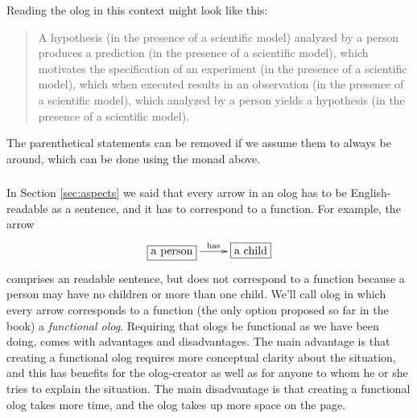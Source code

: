 \documentclass[CT4S-EN-RU]{subfiles}
\begin{document}
\begin{exampleENG}
Reading the olog in this context might look like this:

\begin{quote}
A hypothesis (in the presence of a scientific model) analyzed by a person produces a prediction (in the presence of a scientific model), which motivates the specification of an experiment (in the presence of a scientific model), which when executed results in an observation (in the presence of a scientific model), which analyzed by a person yields a hypothesis (in the presence of a scientific model).
\end{quote}

The parenthetical statements can be removed if we assume them to always be around, which can be done using the monad above.
\end{exampleENG}

\begin{exampleRUS}\label{ex:scientific method}
\end{exampleRUS}


\subsubsection{}\label{sec:relaxing ologs}

\begin{blockENG}
In Section \ref{sec:aspects} we said that every arrow in an olog has to be English-readable as a sentence, and it has to correspond to a function. For example, the arrow 
\begin{align}\label{dia:non-functional but english}
\xymatrix{\fbox{a person}\LA{r}{has}&\fbox{a child}}
\end{align}
comprises an readable sentence, but does not correspond to a function because a person may have no children or more than one child. 
We'll call olog in which every arrow corresponds to a function (the only option proposed so far in the book) a {\em functional olog}. Requiring that ologs be functional as we have been doing, comes with advantages and disadvantages. The main advantage is that creating a functional olog requires more conceptual clarity about the situation, and this has benefits for the olog-creator as well as for anyone to whom he or she tries to explain the situation. The main disadvantage is that creating a functional olog takes more time, and the olog takes up more space on the page.
\end{blockENG}
\end{document}
